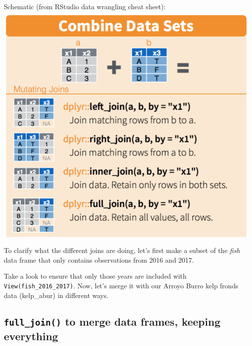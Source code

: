 \documentclass[]{book}
\newenvironment{Shaded}{\begin{snugshade}}{\end{snugshade}}
\newcommand{\DecValTok}[1]{\textcolor[rgb]{0.00,0.00,0.81}{#1}}
\newcommand{\KeywordTok}[1]{\textcolor[rgb]{0.13,0.29,0.53}{\textbf{#1}}}
\newcommand{\NormalTok}[1]{#1}
\newcommand{\OperatorTok}[1]{\textcolor[rgb]{0.81,0.36,0.00}{\textbf{#1}}}
\newcommand{\StringTok}[1]{\textcolor[rgb]{0.31,0.60,0.02}{#1}}
\begin{document}
Schematic (from RStudio data wrangling cheat sheet):
\includegraphics{img/rstudio-cheatsheet-combine-options1.png}

To clarify what the different joins are doing, let's first make a subset of the \emph{fish} data frame that only contains observations from 2016 and 2017.

\begin{Shaded}
\end{Shaded}

Take a look to ensure that only those years are included with \texttt{View(fish\_2016\_2017)}. Now, let's merge it with our Arroyo Burro kelp fronds data (kelp\_abur) in different ways.

\hypertarget{full_join-to-merge-data-frames-keeping-everything}{%
\subsection{\texorpdfstring{\texttt{full\_join()} to merge data frames, keeping everything}{full\_join() to merge data frames, keeping everything}}\label{full_join-to-merge-data-frames-keeping-everything}}
\end{document}

